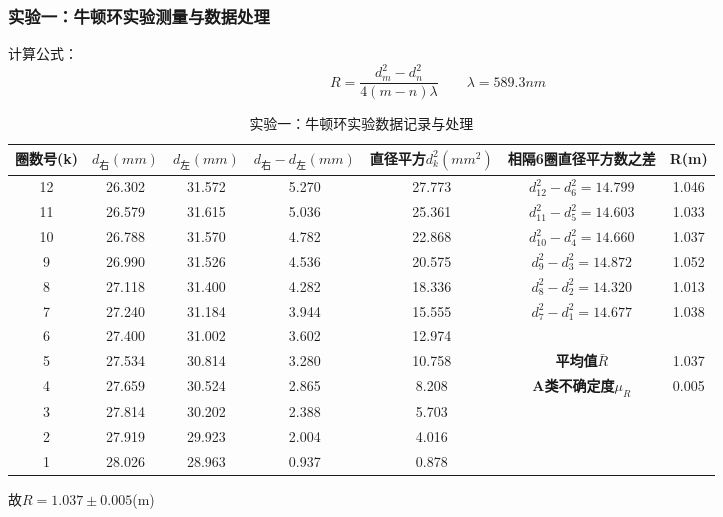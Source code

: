 \documentclass[]{../template/Report}%
\begin{document}
\begin{fullreportonly}
\subsubsection{实验一：牛顿环实验测量与数据处理}
计算公式：
\[
R = \frac{d_m^2-d_n^2}{4(m-n)\lambda} \quad\quad  \lambda = 589.3nm
\]
\par
\begin{table}[H]
    \centering
    \caption{实验一：牛顿环实验数据记录与处理}
    \begin{tabular}{|c|c|c|c|c|c|c|}
        \hline
        \textbf{圈数号(k)} & \textbf{$d_\text{右}(mm)$} & \textbf{$d_\text{左}(mm)$} & \textbf{$d_\text{右}-d_\text{左} (mm)$} & \textbf{直径平方$d_k^2(mm^2)$} & \textbf{相隔6圈直径平方数之差} & \textbf{R(m)}  \\
        \hline
        12 & 26.302 & 31.572 & 5.270 & 27.773 & $d_{12}^2-d_6^2=14.799$ & 1.046  \\
        \hline
        11 & 26.579 & 31.615 & 5.036 & 25.361 & $d_{11}^2-d_5^2=14.603$ & 1.033  \\
        \hline
        10 & 26.788 & 31.570 & 4.782 & 22.868 & $d_{10}^2-d_4^2=14.660$ & 1.037  \\
        \hline
        9 & 26.990 & 31.526 & 4.536 & 20.575 & $d_9^2-d_3^2=14.872$ & 1.052  \\
        \hline
        8 & 27.118 & 31.400 & 4.282 & 18.336 & $d_8^2-d_2^2=14.320$ & 1.013  \\
        \hline
        7 & 27.240 & 31.184 & 3.944 & 15.555 & $d_7^2-d_1^2=14.677$ & 1.038  \\
        \hline
        6 & 27.400 & 31.002 & 3.602 & 12.974 & &  \\
        \hline
        5 & 27.534 & 30.814 & 3.280 & 10.758 & \textbf{平均值$\bar{R}$} & 1.037 \\
        \hline
        4 & 27.659 & 30.524 & 2.865 & 8.208 & \textbf{A类不确定度$\mu_R$} & 0.005 \\
        \hline
        3 & 27.814 & 30.202 & 2.388 & 5.703 & &  \\
        \hline
        2 & 27.919 & 29.923 & 2.004 & 4.016 & &  \\
        \hline
        1 & 28.026 & 28.963 & 0.937 & 0.878 & &  \\
        \hline
    \end{tabular}
\end{table}
故$R = 1.037 \pm 0.005$(m)


\end{fullreportonly}
\end{document}
